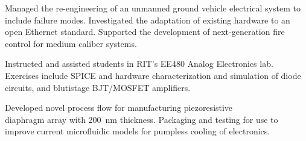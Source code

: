 \documentclass{cv}  %
\begin{document}
\begin{paracol}{2}
\switchcolumn   %


\large{} \hfill \small{} \par\smallskip
\vspace{-8pt}
\small{} \hfill \small{}

\normalsize\rm Managed the re-engineering of an unmanned ground vehicle electrical system to include failure modes. Investigated the adaptation of existing hardware to an open Ethernet standard. Supported the development of next-generation fire control for medium caliber systems.

\hspace{0pt}
\vspace{-24pt}

\divider

\large{} \hfill \small{} \par\smallskip
\vspace{-8pt}
\small{} \hfill \small{}

\normalsize\rm Instructed and assisted students in RIT's EE480 Analog Electronics lab. Exercises include SPICE and hardware characterization and simulation of diode circuits, and blutistage BJT/MOSFET amplifiers.

\hspace{0pt}
\vspace{-24pt}

\divider

\large{} \hfill \small{} \par\smallskip
\vspace{-8pt}
\small{} \hfill \small{}

\normalsize\rm Developed novel process flow for manufacturing piezoresistive \\diaphragm array with \qty{200}{\nm} thickness. Packaging and testing for use to improve current microfluidic models for pumpless cooling of electronics.



\end{paracol}
\end{document}
